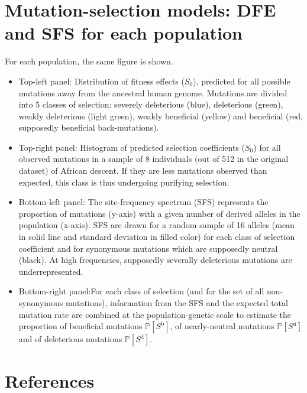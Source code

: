 \documentclass{article}
\newcommand{\proba}{\mathbb{P}}
\newcommand{\Sphy}{S_{0}}
\newcommand{\Spop}{S}
\newcommand{\polyDel}{\Spop^{\text{d}}}
\newcommand{\polyNeutral}{\Spop^{\text{n}}}
\newcommand{\polyAdv}{\Spop^{\text{b}}}
\newcommand{\PpolyDel}{\proba \left[ \polyDel \right]}
\newcommand{\PpolyNeutral}{\proba \left[ \polyNeutral \right]}
\newcommand{\PpolyAdv}{\proba \left[ \polyAdv \right]}
\begin{document}
    \section{Mutation-selection models: DFE and SFS for each population}\label{sec:mutation-selection-models:-histograms-and-sfs-for-each-population}
    For each population, the same figure is shown.
    \begin{itemize}
        \item Top-left panel: Distribution of fitness effects ($\Sphy$), predicted for all possible mutations away from the ancestral human genome.
        Mutations are divided into 5 classes of selection: severely deleterious (blue), deleterious (green), weakly deleterious (light green), weakly beneficial (yellow) and beneficial (red, supposedly beneficial back-mutations).
        \item Top-right panel: Histogram of predicted selection coefficients ($\Sphy$) for all observed mutations in a sample of 8 individuals (out of 512 in the original dataset) of African descent.
        If they are less mutations observed than expected, this class is thus undergoing purifying selection.
        \item Bottom-left panel: The site-frequency spectrum (SFS) represents the proportion of mutations (y-axis) with a given number of derived alleles in the population (x-axis).
        SFS are drawn for a random sample of 16 alleles (mean in solid line and standard deviation in filled color) for each class of selection coefficient and for synonymous mutations which are supposedly neutral (black).
        At high frequencies, supposedly severally deleterious mutations are underrepresented.
        \item Bottom-right panel:For each class of selection (and for the set of all non-synonymous mutations), information from the SFS and the expected total mutation rate are combined at the population-genetic scale to estimate the proportion of beneficial mutations $\PpolyAdv$, of nearly-neutral mutations $\PpolyNeutral$ and of deleterious mutations $\PpolyDel$.
    \end{itemize}

    

    \newpage
    \section{References}
    \printbibliography[heading=none]
\end{document}

